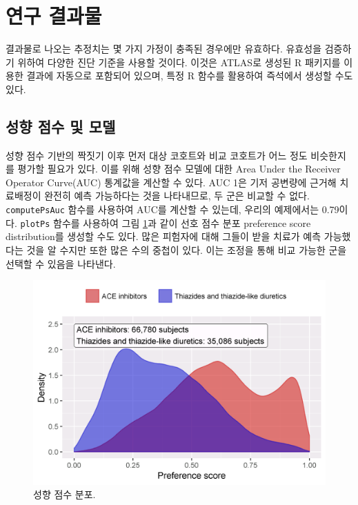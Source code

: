 \documentclass[10.5pt]{book}
\theoremstyle{definition}
\theoremstyle{definition}
\theoremstyle{definition}
\theoremstyle{remark}
\begin{document}
\section{연구 결과물}\label{studyOutputs}

결과물로 나오는 추정치는 몇 가지 가정이 충족된 경우에만 유효하다.
유효성을 검증하기 위하여 다양한 진단 기준을 사용할 것이다. 이것은
ATLAS로 생성된 R 패키지를 이용한 결과에 자동으로 포함되어 있으며, 특정 R
함수를 활용하여 즉석에서 생성할 수도 있다.

\subsection{성향 점수 및 모델}\label{---}

성향 점수 기반의 짝짓기 이후 먼저 대상 코호트와 비교 코호트가 어느 정도
비슷한지를 평가할 필요가 있다. 이를 위해 성향 점수 모델에 대한 Area
Under the Receiver Operator Curve(AUC) 통계값을 계산할 수 있다. AUC 1은
기저 공변량에 근거해 치료배정이 완전히 예측 가능하다는 것을 나타내므로,
두 군은 비교할 수 없다. \texttt{computePsAuc} 함수를 사용하여 AUC를
계산할 수 있는데, 우리의 예제에서는 0.79이다. \texttt{plotPs} 함수를
사용하여 그림 \ref{fig:ps}과 같이 선호 점수 분포 preference score
distribution를 생성할 수도 있다. 많은 피험자에 대해 그들이 받을 치료가
예측 가능했다는 것을 알 수지만 또한 많은 수의 중첩이 있다. 이는 조정을
통해 비교 가능한 군을 선택할 수 있음을 나타낸다.

\begin{figure}

{\centering \includegraphics[width=0.8\linewidth]{images/PopulationLevelEstimation/ps} 

}

\caption{성향 점수 분포.}\label{fig:ps}
\end{figure}
\end{document}
